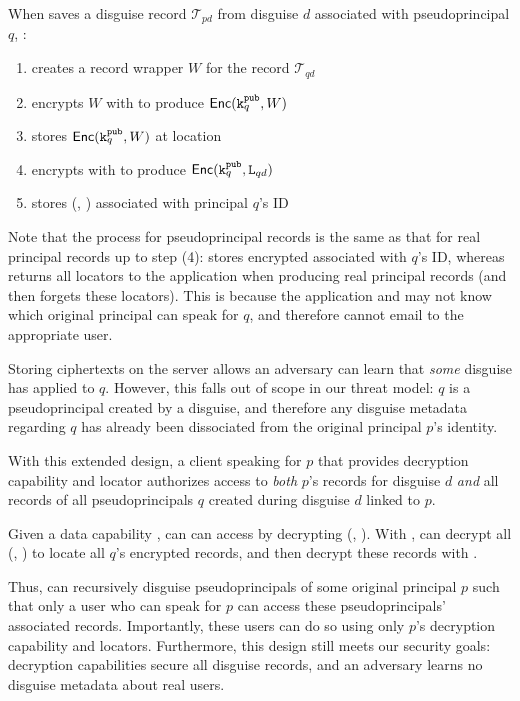 When \sys saves a disguise record $\mathcal{T}_{pd}$ from disguise $d$ associated with pseudoprincipal $q$, \sys:
\begin{enumerate}
    \item creates a record wrapper $W$ for the record $\mathcal{T}_{qd}$
    \item encrypts $W$ with  to produce $\mathsf{Enc}(\texttt{\ensuremath{\texttt{k}^{\text{pub}}_{q}}}, W)$
    \item stores $\mathsf{Enc}(\texttt{\ensuremath{\texttt{k}^{\text{pub}}_{q}}}, W)$ at location 
    \item encrypts  with  to produce $\mathsf{Enc}(\texttt{\ensuremath{\texttt{k}^{\text{pub}}_{q}}}, \texttt{L}_{qd})$
    \item stores \enc(, ) associated with principal $q$'s ID
\end{enumerate}
Note that the process for pseudoprincipal records is the same as that for real principal records up to
step (4): \sys stores encrypted  associated with $q$'s ID, whereas \sys returns all locators to
the application when producing real principal records (and then forgets these locators).
This is because the application and \sys may not know which original principal can speak for $q$,
and therefore cannot \eg email  to the appropriate user.

Storing  ciphertexts on the server allows an adversary can learn that \emph{some} disguise has
applied to $q$. However, this falls out of scope in our threat model: $q$ is a pseudoprincipal
created by a disguise, and therefore any disguise metadata regarding $q$ has already been
dissociated from the original principal $p$'s identity.

With this extended design, a client speaking for $p$ that provides decryption capability 
and locator  authorizes access to \emph{both} $p$'s records for disguise $d$ \emph{and} all
records of all pseudoprincipals $q$ created during disguise $d$ linked to $p$.

Given a data capability , \sys can can access  by decrypting \enc(,
).
%
With , \sys can decrypt all \enc(, ) to locate all $q$'s encrypted
records, and then decrypt these records with . 

Thus, \sys can recursively disguise pseudoprincipals of some original principal $p$ such that only a
user who can speak for $p$ can access these pseudoprincipals' associated records.
Importantly, these users can do so using only $p$'s decryption capability and locators.
Furthermore, this design still meets our security goals: decryption capabilities secure all disguise
records, and an adversary learns no disguise metadata about real users.

